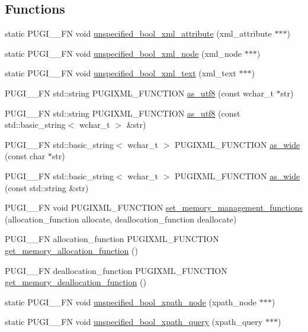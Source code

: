 \subsection*{Functions}
\begin{CompactItemize}
\item 
static PUGI\_\-\_\-FN void \hyperlink{namespacepugi_8effe3a6fc7cc9c1cf2550739dbdc438}{unspecified\_\-bool\_\-xml\_\-attribute} (xml\_\-attribute $\ast$$\ast$$\ast$)
\item 
static PUGI\_\-\_\-FN void \hyperlink{namespacepugi_487b2e720a3808d6fd5730d7c97bcdac}{unspecified\_\-bool\_\-xml\_\-node} (xml\_\-node $\ast$$\ast$$\ast$)
\item 
static PUGI\_\-\_\-FN void \hyperlink{namespacepugi_cfae514de3abac05ed155e531a401c15}{unspecified\_\-bool\_\-xml\_\-text} (xml\_\-text $\ast$$\ast$$\ast$)
\item 
PUGI\_\-\_\-FN std::string PUGIXML\_\-FUNCTION \hyperlink{namespacepugi_390bb44f7ba92b1a8a4f9157799d2ca8}{as\_\-utf8} (const wchar\_\-t $\ast$str)
\item 
PUGI\_\-\_\-FN std::string PUGIXML\_\-FUNCTION \hyperlink{namespacepugi_b4be9ab3dc86b13599b9f2fd2f778dfb}{as\_\-utf8} (const std::basic\_\-string$<$ wchar\_\-t $>$ \&str)
\item 
PUGI\_\-\_\-FN std::basic\_\-string$<$ wchar\_\-t $>$ PUGIXML\_\-FUNCTION \hyperlink{namespacepugi_c2a9782a1c3c725703c6e4533e735d9b}{as\_\-wide} (const char $\ast$str)
\item 
PUGI\_\-\_\-FN std::basic\_\-string$<$ wchar\_\-t $>$ PUGIXML\_\-FUNCTION \hyperlink{namespacepugi_f33046c0db1ff7b3f63327d32fc6dca7}{as\_\-wide} (const std::string \&str)
\item 
PUGI\_\-\_\-FN void PUGIXML\_\-FUNCTION \hyperlink{namespacepugi_993c6b7947c1dec98936510d9e5fe778}{set\_\-memory\_\-management\_\-functions} (allocation\_\-function allocate, deallocation\_\-function deallocate)
\item 
PUGI\_\-\_\-FN allocation\_\-function PUGIXML\_\-FUNCTION \hyperlink{namespacepugi_b36e5aed4e5c952687b42d69daf981eb}{get\_\-memory\_\-allocation\_\-function} ()
\item 
PUGI\_\-\_\-FN deallocation\_\-function PUGIXML\_\-FUNCTION \hyperlink{namespacepugi_9fcabe4b52fbef0f133fab9ff97652ca}{get\_\-memory\_\-deallocation\_\-function} ()
\item 
static PUGI\_\-\_\-FN void \hyperlink{namespacepugi_bca519e72b848d2ebadf5250727da6c5}{unspecified\_\-bool\_\-xpath\_\-node} (xpath\_\-node $\ast$$\ast$$\ast$)
\item 
static PUGI\_\-\_\-FN void \hyperlink{namespacepugi_41b925609dde7657664cf68c6506838b}{unspecified\_\-bool\_\-xpath\_\-query} (xpath\_\-query $\ast$$\ast$$\ast$)
\end{CompactItemize}


